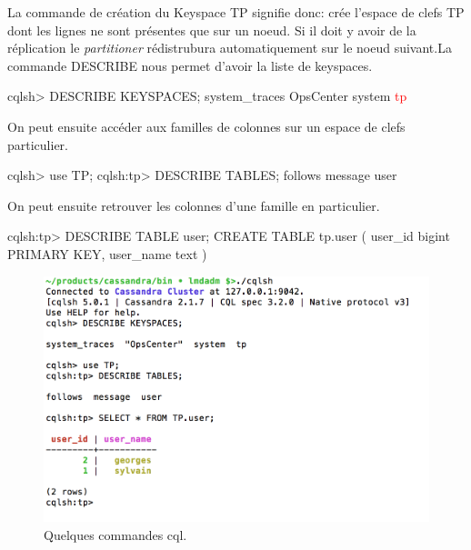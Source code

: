 \par La commande de création du Keyspace TP signifie donc: crée l'espace de clefs TP dont les lignes ne sont présentes que sur un noeud.
Si il doit y avoir de la réplication le \textit{partitioner} rédistrubura automatiquement sur le noeud suivant.\newline La commande DESCRIBE nous permet d'avoir la liste de keyspaces.\newline
\begin{tt} 
\indent cqlsh> DESCRIBE KEYSPACES; \newline 
\indent system\_traces  OpsCenter  system  \textcolor{red}{tp}\end{tt}\newline \newline
On peut ensuite accéder aux familles de colonnes sur un espace de clefs particulier.\newline
\begin{tt}
\indent cqlsh> use TP; \newline 
\indent cqlsh:tp> DESCRIBE TABLES;\newline 
\indent follows  message  user\end{tt}\newline \newline
On peut ensuite retrouver les colonnes d'une famille en particulier. \newline
\begin{tt}
\indent cqlsh:tp> DESCRIBE TABLE user; \newline 
\indent CREATE TABLE tp.user (\newline 
\indent \indent user\_id bigint PRIMARY KEY, \newline
\indent \indent user\_name text \newline 
\indent )\end{tt} 

\begin{figure}[h!]
\centering
\includegraphics[scale=0.5]{img/cqlsh.png}
\caption{Quelques commandes cql.}
\end{figure}

